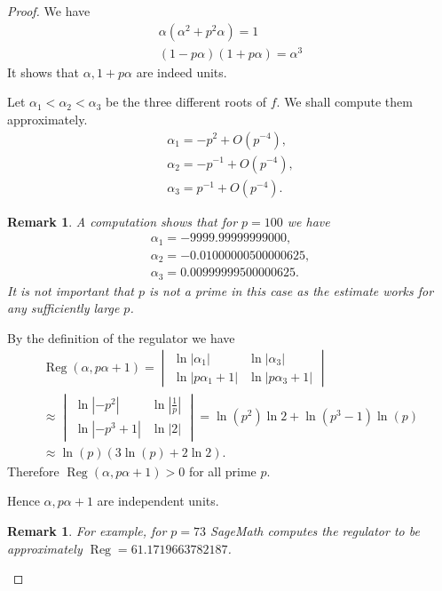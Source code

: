 \documentclass[a4paper]{article}
\newtheorem{Rem}[Thm]{Remark}
\DeclareMathOperator{\Reg}{Reg}        %
\begin{document}
\begin{proof}
We have
\begin{gather}
\alpha (\alpha ^2 + p^2 \alpha) = 1
\\
(1 - p \alpha)(1 + p \alpha) = \alpha^3
\end{gather}
It shows that $\alpha, 1 + p \alpha$ are indeed units.

Let $\alpha_1 < \alpha_2 < \alpha_3 $ be the three different roots of $f$.
We shall compute them approximately.
\begin{gather*}
\alpha_1 = -p^2 + O\left(p^{-4} \right), \\
\alpha_2 = - p^{-1}   + O\left(p^{-4} \right), \\
\alpha_3 = p^{-1} + O\left(p^{-4} \right)
.\end{gather*}

\begin{Rem}
	\label{rem_roots_estimate}
A computation shows that for $p = 100$ we have
\begin{gather*}
\alpha_1 = -9999.99999999000 , \\
\alpha_2 = -0.01000000500000625, \\
\alpha_3 = 0.00999999500000625
.\end{gather*}
It is not important that $p$ is not a prime in this case as the estimate works for any sufficiently large $p$.
\end{Rem}

By the definition of the regulator we have
\begin{multline}
\Reg(\alpha, p\alpha + 1) = 
\begin{vmatrix}
\ln |\alpha_1| 		& \ln |\alpha_3| \\
\ln |p \alpha_1 + 1| 	& \ln |p \alpha_3 + 1|
\end{vmatrix} 
\\
\approx
\begin{vmatrix}
\ln |-p^2| 	& \ln |\frac{1}{p}| \\
\ln |-p^3 + 1| 	& \ln |2|
\end{vmatrix}
=
\ln(p^2)
\ln 2
+
\ln(p^3 - 1) \ln(p)
\\
\approx \ln(p) ( 3 \ln(p) + 2 \ln 2 )
.\end{multline}
Therefore $ \Reg(\alpha, p\alpha + 1) > 0 $ for all prime $p$.

Hence $\alpha, p\alpha + 1$ are independent units. 

\begin{Rem}
For example, for $p = 73$ SageMath computes the regulator to be approximately $\Reg = 61.1719663782187$.


\end{Rem}
\end{proof}
\end{document}

